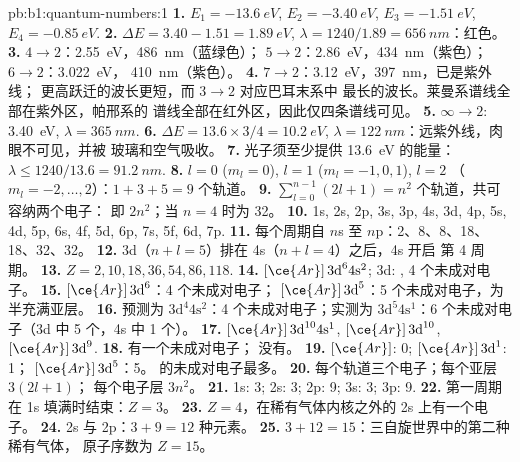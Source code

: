 \begin{solution}{pb:b1:quantum-numbers:1}
\textbf{1.} $E_1 = \qty{-13.6}{eV}$, $E_2 = \qty{-3.40}{eV}$,
$E_3 = \qty{-1.51}{eV}$, $E_4 = \qty{-0.85}{eV}$.
\textbf{2.} $\Delta E = 3.40 - 1.51 = \qty{1.89}{eV}$, $\lambda = 1240/1.89
= \qty{656}{nm}$：红色。
\textbf{3.} $4 \to 2$：\qty{2.55}{eV}，\qty{486}{nm}（蓝绿色）；
$5 \to 2$：\qty{2.86}{eV}，\qty{434}{nm}（紫色）；$6 \to 2$：\qty{3.022}{eV}，
\qty{410}{nm}（紫色）。
\textbf{4.} $7 \to 2$：\qty{3.12}{eV}，\qty{397}{nm}，已是紫外线；
更高跃迁的波长更短，而 $3 \to 2$ 对应巴耳末系中
最长的波长。莱曼系谱线全部在紫外区，帕邢系的
谱线全部在红外区，因此仅四条谱线可见。
\textbf{5.} $\infty \to 2$: \qty{3.40}{eV}, $\lambda = \qty{365}{nm}$.
\textbf{6.} $\Delta E = 13.6 \times 3/4 = \qty{10.2}{eV}$, $\lambda =
\qty{122}{nm}$：远紫外线，肉眼不可见，并被
玻璃和空气吸收。
\textbf{7.} 光子须至少提供 \qty{13.6}{eV} 的能量：$\lambda \le
1240/13.6 = \qty{91.2}{nm}$.
\textbf{8.} $l = 0$ ($m_l = 0$), $l = 1$ ($m_l = -1, 0, 1$), $l = 2$
（$m_l = -2, \dots, 2$）：$1 + 3 + 5 = 9$ 个轨道。
\textbf{9.} $\sum_{l=0}^{n-1}(2l+1) = n^2$ 个轨道，共可容纳两个电子：
即 $2n^2$；当 $n = 4$ 时为 32。
\textbf{10.} 1s, 2s, 2p, 3s, 3p, 4s, 3d, 4p, 5s, 4d, 5p, 6s, 4f, 5d, 6p,
7s, 5f, 6d, 7p.
\textbf{11.} 每个周期自 $n$s 至 $n$p：2、8、8、18、18、32、32。
\textbf{12.} 3d（$n + l = 5$）排在 4s（$n + l = 4$）之后，4s 开启
第 4 周期。
\textbf{13.} $Z = 2, 10, 18, 36, 54, 86, 118$.
\textbf{14.} $[\ce{Ar}]\,3\text{d}^6 4\text{s}^2$; 3d: ,
4 个未成对电子。
\textbf{15.}  $[\ce{Ar}]\,3\text{d}^6$：4 个未成对电子；
 $[\ce{Ar}]\,3\text{d}^5$：5 个未成对电子，为半充满亚层。
\textbf{16.} 预测为 $3\text{d}^4 4\text{s}^2$：4 个未成对电子；实测为
$3\text{d}^5 4\text{s}^1$：6 个未成对电子（3d 中 5 个，4s 中 1 个）。
\textbf{17.}  $[\ce{Ar}]\,3\text{d}^{10} 4\text{s}^1$, 
$[\ce{Ar}]\,3\text{d}^{10}$,  $[\ce{Ar}]\,3\text{d}^9$.
\textbf{18.}  有一个未成对电子； 没有。
\textbf{19.}  $[\ce{Ar}]$: 0;  $[\ce{Ar}]\,3\text{d}^1$:
1； $[\ce{Ar}]\,3\text{d}^5$：5。 的未成对电子最多。
\textbf{20.} 每个轨道三个电子；每个亚层 $3(2l + 1)$；
每个电子层 $3n^2$。
\textbf{21.} 1s: 3; 2s: 3; 2p: 9; 3s: 3; 3p: 9.
\textbf{22.} 第一周期在 1s 填满时结束：$Z = 3$。
\textbf{23.} $Z = 4$，在稀有气体内核之外的 2s 上有一个电子。
\textbf{24.} 2s 与 2p：$3 + 9 = 12$ 种元素。
\textbf{25.} $3 + 12 = 15$：三自旋世界中的第二种稀有气体，
原子序数为 \textbf{$Z = 15$}。
\end{solution}
